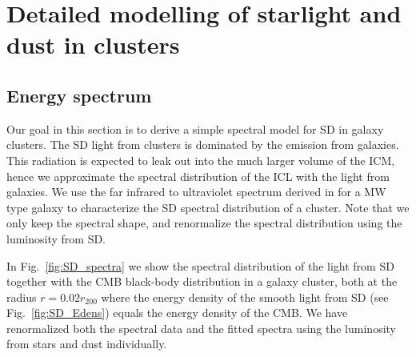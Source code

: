 \documentclass[10pt,aps,pra,reprint,amsmath,amsfonts,amssymb,showpacs,nofootinbib,floatfix]{revtex4-1}
\newcommand{\rvir}{r_{200}}
\begin{document}
%


\vspace{-0.7cm}

%
%

\appendix

\section{Detailed modelling of  starlight and dust in clusters}


\subsection{Energy spectrum}

Our goal in this section is to derive a simple spectral model for SD
in galaxy clusters. The SD light from clusters is dominated by the
emission from galaxies. This radiation is expected to leak out into
the much larger volume of the ICM, hence we approximate the spectral
distribution of the ICL with the light from galaxies. We use the far
infrared to ultraviolet spectrum derived in \cite{2006ApJ...648L..29P}
for a MW type galaxy to characterize the SD spectral distribution of a
cluster. Note that we only keep the spectral shape, and renormalize
the spectral distribution using the luminosity from SD.

In Fig.~\ref{fig:SD_spectra} we show the spectral distribution of the
light from SD together with the CMB black-body distribution in a
galaxy cluster, both at the radius $r=0.02\rvir$ where the energy
density of the smooth light from SD (see Fig.~\ref{fig:SD_Edens})
equals the energy density of the CMB. We have renormalized both the
spectral data and the fitted spectra using the luminosity from stars
and dust individually.
\end{document}
